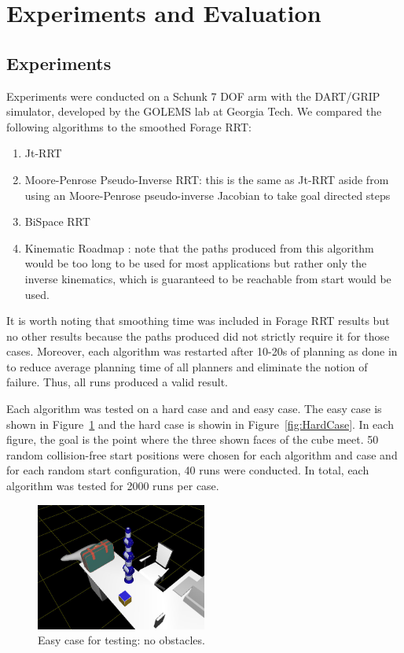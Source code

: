 \documentclass[conference]{IEEEtran}
\begin{document}
\section{Experiments and Evaluation}
\label{sec:evaluation}
\subsection{Experiments}
Experiments were conducted on a Schunk 7 DOF arm with the DART/GRIP simulator, developed by the GOLEMS lab at Georgia Tech. We compared the
following algorithms to the smoothed Forage RRT:
\begin{enumerate}
	\item Jt-RRT \cite{vande07}
	\item Moore-Penrose Pseudo-Inverse RRT: this is the same as Jt-RRT aside from using an Moore-Penrose pseudo-inverse Jacobian to take
	      goal directed steps
	\item BiSpace RRT \cite{diankov08}
	\item Kinematic Roadmap \cite{ahuactzin99}: note that the paths produced from this algorithm would be too long to be used for most
	      applications but rather only the inverse kinematics, which is guaranteed to be reachable from start would be used.
\end{enumerate}

It is worth noting that smoothing time was included in Forage RRT results but no other results because the paths produced did not strictly
require it for those cases. Moreover, each algorithm was restarted after 10-20s of planning as done in \cite{diankov08} to reduce average
planning time of all planners and eliminate the notion of failure. Thus, all runs produced a valid result.

Each algorithm was tested on a hard case and and easy case. The easy case is shown in Figure~\ref{fig:EasyCase} and the hard case is showin
in Figure~\ref{fig:HardCase}. In each figure, the goal is the point where the three shown faces of the cube meet. 50 random collision-free
start positions were chosen for each algorithm and case and for each random start configuration, 40 runs were conducted. In total, each
algorithm was tested for 2000 runs per case. 

\begin{figure}[h!]
  \centering
    \includegraphics[width=0.5\textwidth]{figures/EasyCase.jpg}
  \caption{Easy case for testing: no obstacles. \label{fig:EasyCase} }
\end{figure}
\end{document}
